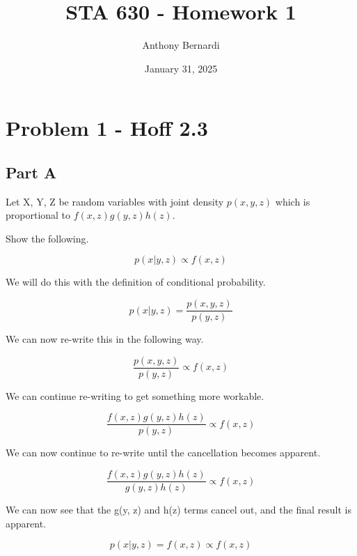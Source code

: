 \documentclass[12pt, letterpaper]{article}
\title{STA 630 - Homework 1}
\author{Anthony Bernardi}
\date{January 31, 2025}
\begin{document}
\maketitle

\section{Problem 1 - Hoff 2.3}

\subsection{Part A}

Let X, Y, Z be random variables with joint density $p(x, y, z)$ which is proportional to $f(x, z) g(y, z) h(z)$. 

Show the following. 

\begin{equation} 
p(x | y, z) \propto f(x, z) 
\end{equation} 

We will do this with the definition of conditional probability. 

\begin{equation}
p(x | y, z) = \frac{p(x, y, z)}{p(y, z)} 
\end{equation} 

We can now re-write this in the following way. 

\begin{equation} 
\frac{p(x, y, z)}{p(y, z)} \propto f(x, z)
\end{equation}

We can continue re-writing to get something more workable. 

\begin{equation}
\frac{f(x, z) g(y, z) h(z)}{p(y , z)} \propto f(x, z) 
\end{equation} 

We can now continue to re-write until the cancellation becomes apparent. 

\begin{equation} 
\frac{f(x, z) g(y, z) h(z)}{g(y, z) h(z)} \propto f(x, z) 
\end{equation} 

We can now see that the g(y, z) and h(z) terms cancel out, and the final result is apparent. 

\begin{equation} 
p(x | y, z)  = f(x, z) \propto f(x, z) 
\end{equation} 
\end{document}
